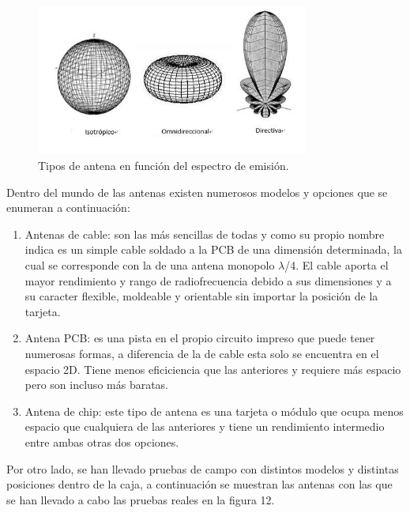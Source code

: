 \documentclass[paper=a4, fontsize=11pt,twoside]{scrartcl}	%
\begin{document}
            \begin{center}
                \begin{figure}[h]
                    \centering
                    \includegraphics[width=0.8\textwidth]{antenna_types.PNG}
                    \caption{Tipos de antena en función del espectro de emisión.}
                    \label{fig:mesh10}
                \end{figure}
            \end{center}
            Dentro del mundo de las antenas existen numerosos modelos y opciones que se enumeran a continuación:
            \begin{enumerate}
                \item Antenas de cable: son las más sencillas de todas y como su propio nombre indica es un simple cable soldado a la PCB de una dimensión determinada, la cual se corresponde con la de una antena monopolo $\lambda$/4. El cable aporta el mayor rendimiento y rango de radiofrecuencia debido a sus dimensiones y a su caracter flexible, moldeable y orientable sin importar  la posición de la tarjeta.
                \item Antena PCB: es una pista en el propio circuito impreso que puede tener numerosas formas, a diferencia de la de cable esta solo se encuentra en el espacio 2D. Tiene menos eficiciencia que las anteriores y requiere más espacio pero son incluso más baratas.
                \item Antena de chip: este tipo de antena es una tarjeta o módulo que ocupa menos espacio que cualquiera de las anteriores y tiene un rendimiento intermedio entre ambas otras dos opciones.
            \end{enumerate}
            Por otro lado, se han llevado pruebas de campo con distintos modelos y distintas posiciones dentro de la caja, a continuación se muestran las 
            antenas con las que se han llevado a cabo las pruebas reales en la figura 12. 
\end{document}
